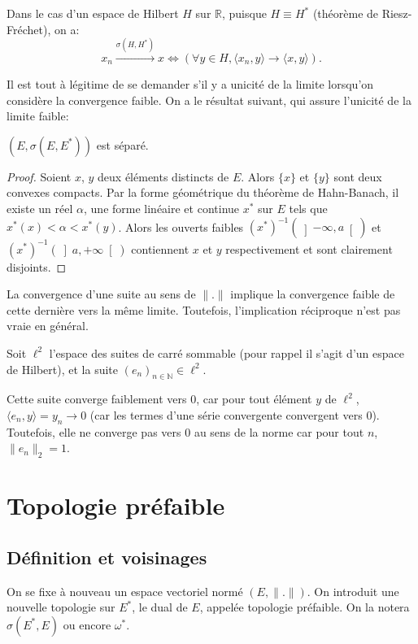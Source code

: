 Dans le cas d'un espace de Hilbert $H$ sur $\mathbb R$, puisque $H\equiv H^*$
(théorème de Riesz-Fréchet), on a:
$$x_n\xrightarrow{\sigma(H, H^*)}x \iff
\left(\forall y\in H, \langle x_n, y\rangle \to \langle x, y\rangle\right).$$

Il est tout à légitime de se demander s'il y a unicité de la limite
lorsqu'on considère la convergence faible. On a le résultat suivant, qui
assure l'unicité de la limite faible:
\begin{prop}
  $(E, \sigma(E, E^*))$ est séparé.
\end{prop}

\begin{proof}
  Soient $x$, $y$ deux éléments distincts de $E$. Alors $\{x\}$ et
  $\{y\}$ sont deux convexes compacts.
  Par la forme géométrique du théorème de Hahn-Banach, il existe
  un réel $\alpha$, une forme linéaire et continue $x^*$ sur $E$
  tels que $x^*(x) < \alpha < x^*(y)$.
  Alors les ouverts faibles $(x^*)^{-1}(\left]-\infty, a\right[)$
  et $(x^*)^{-1}(\left]a, +\infty\right[)$ contiennent $x$
  et $y$ respectivement et sont clairement disjoints.
\end{proof}

\begin{rem}
  La convergence d'une suite au sens de $\|.\|$ implique la convergence faible
  de cette dernière vers la même limite. Toutefois, l'implication réciproque
  n'est pas vraie en général.

  Soit $\ell^2$ l'espace des suites de carré sommable
  (pour rappel il s'agit d'un espace
  de Hilbert), et la suite $(e_n)_{n\in\mathbb N}\in \ell^2$.

  Cette suite converge faiblement vers $0$, car pour tout élément
  $y$ de $\ell^2$, $\langle e_n, y\rangle = y_n \to 0$ (car
  les termes d'une série convergente convergent vers $0$).
  Toutefois, elle ne converge pas vers $0$ au sens de la norme
  car pour tout $n$, $\|e_n\|_2 = 1$.
\end{rem}

\section{Topologie préfaible}
\subsection{Définition et voisinages}
On se fixe à nouveau un espace vectoriel normé $(E, \|.\|)$. On introduit
une nouvelle topologie sur $E^*$, le dual de $E$, appelée topologie
préfaible. On la notera $\sigma(E^*, E)$ ou encore $\omega^*$.

